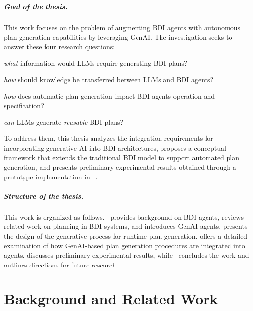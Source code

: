 \documentclass[12pt,a4paper,openright,twoside]{book}
\begin{document}
\paragraph{Goal of the thesis.} This work focuses on the problem of augmenting \ac{BDI} agents with autonomous plan generation capabilities by leveraging \ac{GenAI}. The investigation seeks to answer these four research questions:
%
\begin{enumerate*}[label=\textbf{(RQ\arabic*)}]
    \item\label{rq:required-info} \emph{what} information would \acp{LLM} require generating \ac{BDI} plans?
    \item\label{rq:knowledge-transfer} \emph{how} should knowledge be transferred between \acp{LLM} and \ac{BDI} agents?
    \item\label{rq:agent-spec} \emph{how} does automatic plan generation impact \ac{BDI} agents operation and specification?
    \item\label{rq:reusability} \emph{can} \acp{LLM} generate \emph{reusable} \ac{BDI} plans?
\end{enumerate*}
%
To address them, this thesis analyzes the integration requirements for incorporating generative AI into \ac{BDI} architectures, proposes a conceptual framework that extends the traditional \ac{BDI} model to support automated plan generation, and presents preliminary experimental results obtained through a prototype implementation in \jakta{}~\cite{JaktaSNCS2024}.

\paragraph{Structure of the thesis.} This work is organized as follows.~ provides background on \ac{BDI} agents, reviews related work on planning in \ac{BDI} systems, and introduces \ac{GenAI} agents. 
%
 presents the design of the generative process for runtime plan generation. 
%
 offers a detailed examination of how \ac{GenAI}-based plan generation procedures are integrated into \agentspeak{} agents.
%
 discusses preliminary experimental results, while~ concludes the work and outlines directions for future research.

\chapter{Background and Related Work}\label{sec:background}
\end{document}
